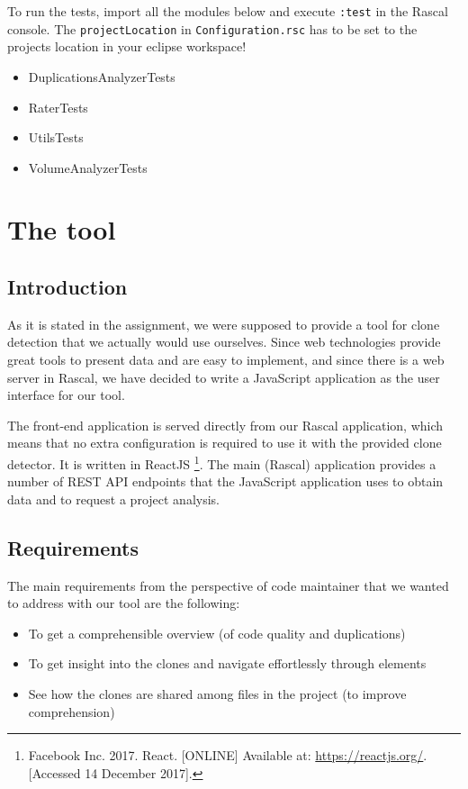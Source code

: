 \documentclass{uva-inf-article}
\begin{document}
To run the tests, import all the modules below and execute \texttt{:test} in the Rascal console. The \texttt{projectLocation} in \texttt{Configuration.rsc} has to be set to the projects location in your eclipse workspace!

\begin{itemize}

\item
  DuplicationsAnalyzerTests
\item
  RaterTests
\item
  UtilsTests
\item
  VolumeAnalyzerTests
\end{itemize}


\section{The tool}

\subsection{Introduction}
As it is stated in the assignment, we were supposed to provide a tool for clone detection that we actually would use ourselves.  Since web technologies provide great tools to present data and are easy to implement, and since there is a web server in Rascal, we have decided to write a JavaScript application as the user interface for our tool. 

The front-end application is served directly from our Rascal application, which means that no extra configuration is required to use it with the provided clone detector. It is written in ReactJS \footnote{Facebook Inc. 2017. React. [ONLINE] Available at: \url{https://reactjs.org/}. [Accessed 14 December 2017].
}. The main (Rascal) application provides a number of REST API endpoints that the JavaScript application uses to obtain data and to request a project analysis. 

\subsection{Requirements}
The main requirements from the perspective of code maintainer that we wanted to address with our tool are the following: 

\begin{itemize}
    \item{To get a comprehensible overview (of code quality and duplications)}
    \item{To get insight into the clones and navigate effortlessly through elements}
    \item{See how the clones are shared among files in the project (to improve comprehension) }
\end{itemize}
\end{document}
